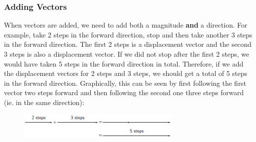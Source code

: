             \subsubsection{ Adding Vectors}
            \nopagebreak
            
        
        \label{m38813*id188304}When vectors are added, we need to add both a magnitude \textbf{and} a direction. For example, take 2 steps in the forward direction, stop and then take another 3 steps in the forward direction. The first 2 steps is a displacement vector and the second 3 steps is also a displacement vector. If we did not stop after the first 2 steps, we would have taken 5 steps in the forward direction in total. Therefore, if we add the displacement vectors for 2 steps and 3 steps, we should get a total of 5 steps in the forward direction. Graphically, this can be seen by first following the first vector two steps forward and then following the second one three steps forward (ie. in the same direction):\par 
        \label{m38813*id188318}
          
    \setcounter{subfigure}{0}


	\begin{figure}[H] %
    \begin{center}
    \label{m38813*id188322!!!underscore!!!media}\label{m38813*id188322!!!underscore!!!printimage}\includegraphics[width=300px]{col11305.imgs/m38813_PG11C1_013.png} %
        
      \vspace{2pt}
    \vspace{.1in}
    
    \end{center}

 \end{figure}   

    \addtocounter{footnote}{-0}
    
